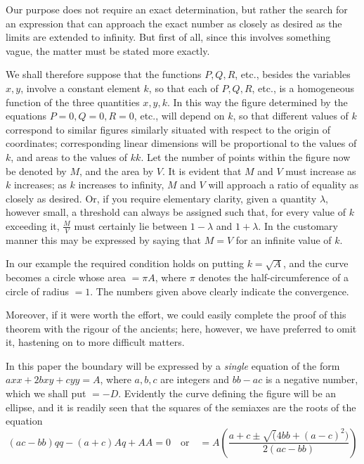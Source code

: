 Our purpose does not require an exact determination, but rather the search for an expression that can approach the exact number as closely as desired as the limits are extended to infinity. But first of all, since this involves something vague, the matter must be stated more exactly.

We shall therefore suppose that the functions $P,Q,R$, etc., besides the variables $x,y$, involve a constant element $k$, so that each of $P,Q,R$, etc., is a homogeneous function of the three quantities $x,y,k$. In this way the figure determined by the equations $P=0,Q=0,R=0$, etc., will depend on $k$, so that different values of $k$ correspond to similar figures similarly situated with respect to the origin of coordinates; corresponding linear dimensions will be proportional to the values of $k$, and areas to the values of $kk$. Let the number of points within the figure now be denoted by $M$, and the area by $V$. It is evident that $M$ and $V$ must increase as $k$ increases; as $k$ increases to infinity, $M$ and $V$ will approach a ratio of equality as closely as desired. Or, if you require elementary clarity, given a quantity $\lambda$, however small, a threshold can always be assigned such that, for every value of $k$ exceeding it, $\frac MV$ must certainly lie between $1-\lambda$ and $1+\lambda$. In the customary manner this may be expressed by saying that $M=V$ for an infinite value of $k$.

In our example the required condition holds on putting $k=\surd A$, and the curve becomes a circle whose area $=\pi A$, where $\pi$ denotes the half-circumference of a circle of radius $=1$. The numbers given above clearly indicate the convergence.

Moreover, if it were worth the effort, we could easily complete the proof of this theorem with the rigour of the ancients; here, however, we have preferred to omit it, hastening on to more difficult matters.

In this paper the boundary will be expressed by a \emph{single} equation of the form $axx+2bxy+cyy=A$, where $a,b,c$ are integers and $bb-ac$ is a negative number, which we shall put $=-D$. Evidently the curve defining the figure will be an ellipse, and it is readily seen that the squares of the semiaxes are the roots of the equation
\[
(ac-bb)qq-(a+c)Aq+AA=0\quad\text{or}\quad
=A\left(\frac{a+c\pm\surd(4bb+(a-c)^2)}{2(ac-bb)}\right)
\]

